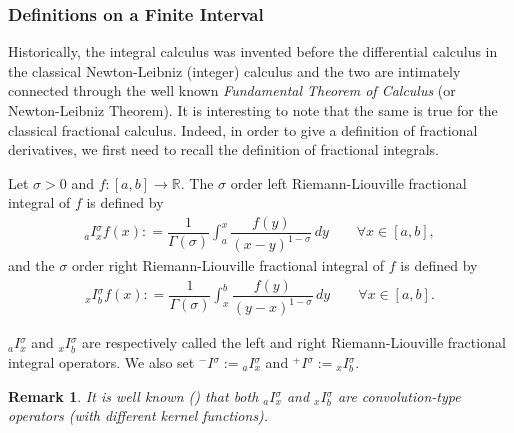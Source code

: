 \documentclass[leqno,final]{siamltex}
\numberwithin{equation}{section}
\newtheorem{remark}{Remark}[section]
\renewcommand{\(}{\bigl(}
\renewcommand{\)}{\bigr)}
\newcommand{\R}{\mathbb{R}}
\begin{document}
        \subsubsection{\bf Definitions on a Finite Interval}\label{sec-2.1.1}
            Historically, the integral calculus was invented before the differential calculus in the classical Newton-Leibniz (integer) calculus  and the two are intimately connected through the well known {\em Fundamental Theorem of Calculus} (or Newton-Leibniz Theorem). It is interesting to note that the same is true for the classical fractional calculus. Indeed, in order to give a definition of fractional derivatives,  we first need to recall the definition of fractional integrals.

            \begin{definition} \label{def2.1}
                Let $\sigma>0$ and $f:[a,b] \rightarrow \R$. The $\sigma$  order left Riemann-Liouville fractional integral of $f$ is defined by
                \begin{align} \label{left_RL_int}
                    {_{a}}{I}{^{\sigma}_{x}} f(x) : = \dfrac{1}{\Gamma(\sigma)} \int_{a}^{x} \dfrac{f(y)}{(x - y)^{1 - \sigma}} \, dy \qquad\forall x\in [a,b], 
                \end{align}
                and the $\sigma$ order right Riemann-Liouville fractional integral of $f$ is defined by 
                \begin{align}\label{right_RL_int}
                    {_{x}}{I}{^{\sigma}_{b}} f(x) : = \dfrac{1}{\Gamma(\sigma)} \int_{x}^{b} \dfrac{f(y)}{(y-x)^{1 - \sigma}}\, dy\qquad \forall x\in [a,b].
                \end{align}
            \end{definition}
            ${_{a}}{I}{^{\sigma}_{x}}$ and $ {_{x}}{I}{^{\sigma}_{b}}$ are respectively called the left and right Riemann-Liouville fractional integral operators. We also set ${^{-}}{I}{^{\sigma}} := {_{a}}{I}{^{\sigma}_{x}}$ and ${^{+}}{I}{^{\sigma}} := {_{x}}{I}{^{\sigma}_{b}}$. 


            \begin{remark}
                It is well known (\cite{Samko}) that both $ {_{a}}{I}{^{\sigma}_{x}}$ and ${_{x}}{I}{^{\sigma}_{b}}$ are convolution-type operators (with different kernel functions). %
            \end{remark} 
\end{document}
